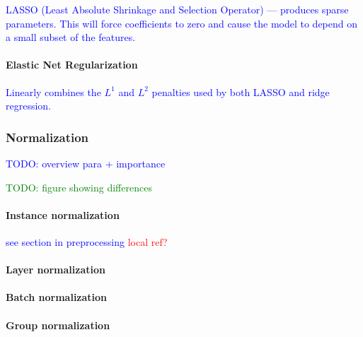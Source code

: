 \textcolor{blue}{LASSO (Least Absolute Shrinkage and Selection Operator) --- produces sparse parameters. This will force coefficients to zero and cause the model to depend on a small subset of the features.}


\paragraph{Elastic Net Regularization}

\textcolor{blue}{Linearly combines the $L^1$ and $L^2$ penalties used by both LASSO and ridge regression.}



\subsubsection{Normalization}

\textcolor{blue}{TODO: overview para + importance}

\textcolor{green}{TODO: figure showing differences}

\paragraph{Instance normalization}

\textcolor{blue}{see section in preprocessing \textcolor{red}{local ref?}}

\paragraph{Layer normalization}

\paragraph{Batch normalization}

\paragraph{Group normalization}